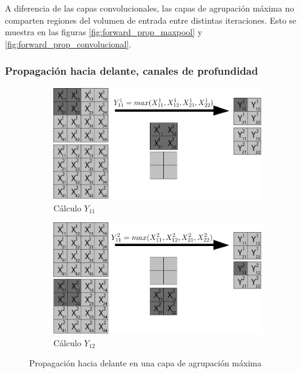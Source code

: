 A diferencia de las capas convolucionales, las capas de agrupación máxima no comparten regiones del volumen de entrada entre distintas iteraciones. Esto se muestra en las figuras \ref{fig:forward_prop_maxpool} y \ref{fig:forward_prop_convolucional}.


\subsubsection{Propagación hacia delante, canales de profundidad}

\begin{figure}[H]
	\centering
	\begin{subfigure}{.5\textwidth}
		\hspace{-10mm}
		\includegraphics[width=1.2\linewidth]{imagenes/maxpool_2capas_1.jpg}  
		\caption{Cálculo $Y_{11}$}
	\end{subfigure}%
	\begin{subfigure}{.5\textwidth}
		\hspace{10mm}
		\includegraphics[width=1.2\linewidth]{imagenes/maxpool_2capas_2.jpg}  
		\caption{Cálculo $Y_{12}$}
	\end{subfigure}
	
	\caption{Propagación hacia delante en una capa de agrupación máxima}
	\label{fig:forward_prop_maxpool_canales_profundidad}
\end{figure}

